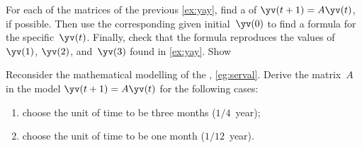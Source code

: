 \begin{exercise}  
For each of the matrices of the previous \cref{ex:yay}, find a  of \(\yv(t+1)=A\yv(t)\), if possible.
Then use the corresponding given initial~\(\yv(0)\) to find a formula for the specific~\(\yv(t)\).
Finally, check that the formula reproduces the values of \(\yv(1)\), \(\yv(2)\), and~\(\yv(3)\) found in \cref{ex:yay}.
Show 
\end{exercise}





\begin{exercise}  
Reconsider the mathematical modelling of the , \cref{eg:serval}.
Derive the matrix~\(A\) in the model \(\yv(t+1)=A\yv(t)\) for the following cases:
\begin{enumerate}
\item choose the unit of time to be three months (\(1/4\)~year);

\item choose the unit of time to be one month  (\(1/12\)~year).

\end{enumerate}
\end{exercise}





